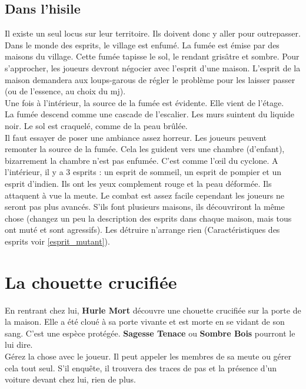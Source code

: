 \documentclass[oneside,12pt]{book}
\newcommand{\Jessica}{\textbf{Sagesse Tenace} }
\newcommand{\Peter}{\textbf{Hurle Mort} }
\newcommand{\Leonard}{\textbf{Sombre Bois} }
\begin{document}
\begin{flushleft}
\subsection{Dans l'hisile}
\label{hisile_enquete}
Il existe un seul locus sur leur territoire. Ils doivent donc y aller pour outrepasser.
Dans le monde des esprits, le village est enfumé. La fumée est émise par des maisons du village. 
Cette fumée tapisse le sol, le rendant grisâtre et sombre.
Pour s'approcher, les joueurs devront négocier avec l'esprit d'une maison. 
L'esprit de la maison demandera aux loups-garous de régler le problème pour les laisser passer 
(ou de l'essence, au choix du mj).\\
Une fois à l'intérieur, la source de la fumée est évidente. Elle vient de l'étage.\\
La fumée descend comme une cascade de l'escalier. Les murs suintent du liquide noir. 
Le sol est craquelé, comme de la peau brûlée.\\
Il faut essayer de poser une ambiance assez horreur. Les joueurs peuvent remonter la source de la fumée. 
Cela les guident vers une chambre (d'enfant), bizarrement la chambre n'est pas enfumée. 
C'est comme l’œil du cyclone. A l'intérieur, il y a 3 esprits : un esprit de sommeil, un esprit de pompier et un esprit d'indien.
Ils ont les yeux complement rouge et la peau déformée. Ils attaquent à vue la meute. 
Le combat est assez facile cependant les joueurs ne seront pas plus avancés. 
S'ils font plusieurs maisons, ils découvriront la même chose 
(changez un peu la description des esprits dans chaque maison, mais tous ont muté et sont agressifs). 
Les détruire n'arrange rien (Caractéristiques des esprits voir \ref{esprit_mutant}). 

\section{La chouette crucifiée}
\label{chouette}
En rentrant chez lui, \Peter découvre une chouette crucifiée sur la porte de la maison. 
Elle a été cloué à sa porte vivante et est morte en se vidant de son sang. C'est une espèce protégée. 
\Jessica ou \Leonard pourront le lui dire.\\
Gérez la chose avec le joueur. 
Il peut appeler les membres de sa meute ou gérer cela tout seul. 
S'il enquête, il trouvera des traces de pas et la présence d'un voiture devant chez lui, rien de plus.


\end{flushleft}
\end{document}
